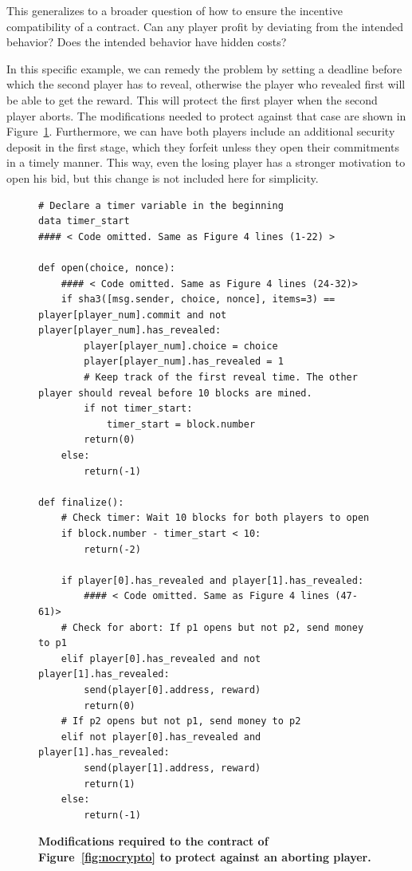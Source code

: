 \documentclass{llncs}
\begin{document}
This generalizes to a broader question of how to 
ensure the incentive compatibility of a contract.
Can any player profit by deviating from the intended behavior?
Does the intended behavior have hidden costs?

In this specific example, we can remedy the problem by setting a deadline before which the second player 
has to reveal, otherwise the player who revealed first will be able to get the reward. This will protect
the first player when the second player aborts. The modifications needed to protect against that case are shown in Figure~\ref{fig:withtimers}. Furthermore, we can have both players include an additional security deposit in the first stage, which they forfeit unless they open their commitments in a timely manner.
This way, even the losing player has a stronger motivation to open his bid, but this change is not included here for simplicity.

\begin{figure}[!t]
\centering
\begin{mdframed}
\begin{verbatim}
# Declare a timer variable in the beginning
data timer_start
#### < Code omitted. Same as Figure 4 lines (1-22) >

def open(choice, nonce):
	#### < Code omitted. Same as Figure 4 lines (24-32)>  
	if sha3([msg.sender, choice, nonce], items=3) == player[player_num].commit and not player[player_num].has_revealed:
		player[player_num].choice = choice
		player[player_num].has_revealed = 1	
		# Keep track of the first reveal time. The other player should reveal before 10 blocks are mined.
		if not timer_start:
			timer_start = block.number
		return(0)
	else:
		return(-1)

def finalize():
	# Check timer: Wait 10 blocks for both players to open
	if block.number - timer_start < 10: 
		return(-2)
	
	if player[0].has_revealed and player[1].has_revealed:
		#### < Code omitted. Same as Figure 4 lines (47-61)> 
	# Check for abort: If p1 opens but not p2, send money to p1
	elif player[0].has_revealed and not player[1].has_revealed:
		send(player[0].address, reward)
		return(0)
	# If p2 opens but not p1, send money to p2
	elif not player[0].has_revealed and player[1].has_revealed:
		send(player[1].address, reward)
		return(1)
	else:
		return(-1)
\end{verbatim}
\end{mdframed}
\caption{
\label{fig:withtimers}
{\bf Modifications required to the contract of Figure~\ref{fig:nocrypto} to protect against an aborting player.} 
}
\end{figure}
\end{document}
